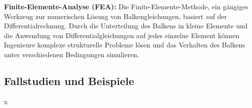 \textbf{ Finite-Elemente-Analyse (FEA):}
Die Finite-Elemente-Methode, ein gängiges Werkzeug zur numerischen Lösung von Balkengleichungen, basiert auf der Differentialrechnung. 
Durch die Unterteilung des Balkens in kleine Elemente und die Anwendung von Differentialgleichungen auf jedes einzelne Element können Ingenieure komplexe strukturelle Probleme lösen und das Verhalten des Balkens unter verschiedenen Bedingungen simulieren.


\subsection{Fallstudien und Beispiele
\label{Fallstudien und Beispiele}}
x
